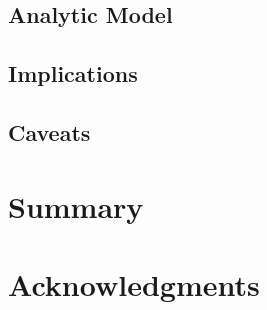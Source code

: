 \documentclass[useAMS,usenatbib]{mn2e}
\begin{document}
\subsection{Analytic Model}
\subsection{Implications}
\subsection{Caveats}

% 
\section{Summary}

% 
\section*{Acknowledgments}

%
\end{document}
